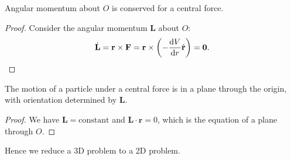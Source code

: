 \begin{proposition}
    Angular momentum about $O$ is conserved for a central force.
\end{proposition}
\begin{proof}
    Consider the angular momentum $\mathbf{L}$ about $O$: 
    \[
        \dot{\mathbf{L}} = \mathbf{r} \times \mathbf{F} = \mathbf{r} \times \left( -\frac{\mathrm{d}V}{\mathrm{d}r} \hat{\mathbf{r}} \right) = \mathbf{0}.\qedhere
    \]
\end{proof}
\begin{proposition}
    The motion of a particle under a central force is in a plane through the origin, with orientation determined by $\mathbf{L}$.
\end{proposition}
\begin{proof}
    We have $ \mathbf{L} = \text{constant} $ and $ \mathbf{L} \cdot \mathbf{r}=0 $, which is the equation of a plane through $O$.
\end{proof}
Hence we reduce a 3D problem to a 2D problem.

